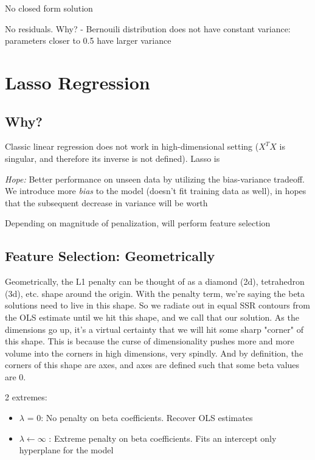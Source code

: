 \documentclass{article}
\begin{document}
No closed form solution

No residuals. Why?
	- Bernouili  distribution does not have constant variance: parameters closer to 0.5 have larger variance

\section{Lasso Regression}

\subsection{Why?}

Classic linear regression does not work in high-dimensional setting ($X^T X$ is singular, and therefore its inverse is not defined). Lasso is
	
\textit{Hope:} Better performance on unseen data by utilizing the bias-variance tradeoff. We introduce more \textit{bias} to the model (doesn't fit training data as well), in hopes that the subsequent decrease in variance will be worth 

Depending on magnitude of penalization, will perform feature selection

\subsection{Feature Selection: Geometrically}

Geometrically, the L1 penalty can be thought of as a diamond (2d), tetrahedron (3d), etc. shape around the origin. With the penalty term, we're saying the beta solutions need to live in this shape. So we radiate out in equal SSR contours from the OLS estimate until we hit this shape, and we call that our solution. As the dimensions go up, it's a virtual certainty that we will hit some sharp "corner" of this shape. This is because the curse of dimensionality pushes more and more volume into the corners in high dimensions, very spindly. And by definition, the corners of this shape are axes, and axes are defined such that some beta values are 0.

2 extremes:
\begin{itemize}
	\item $\lambda$ = 0: No penalty on beta coefficients. Recover OLS estimates
	\item $\lambda \leftarrow \infty$ : Extreme penalty on beta coefficients. Fits an intercept only hyperplane for the model
\end{itemize}
\end{document}
